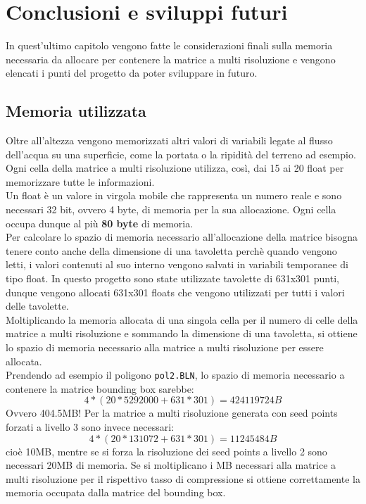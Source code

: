 \chapter{Conclusioni e sviluppi futuri}
	In quest'ultimo capitolo vengono fatte le considerazioni finali sulla memoria necessaria da allocare per contenere la matrice a multi risoluzione e vengono elencati i punti del progetto da poter sviluppare in futuro.

	\section{Memoria utilizzata}
		Oltre all'altezza vengono memorizzati altri valori di variabili legate al flusso dell'acqua su una superficie, come la portata o la ripidit\`{a} del terreno ad esempio. Ogni cella della matrice a multi risoluzione utilizza, cos\`{i}, dai 15 ai 20 float per memorizzare tutte le informazioni.\\
		Un float \`{e} un valore in virgola mobile che rappresenta un numero reale e sono necessari 32 bit, ovvero 4 byte, di memoria per la sua allocazione. Ogni cella occupa dunque al pi\`{u} \textbf{80 byte} di memoria.\\
		Per calcolare lo spazio di memoria necessario all'allocazione della matrice bisogna tenere conto anche della dimensione di una tavoletta perch\`{e} quando vengono letti, i valori contenuti al suo interno vengono salvati in variabili temporanee di tipo float. In questo progetto sono state utilizzate tavolette di 631x301 punti, dunque vengono allocati 631x301 floats che vengono utilizzati per tutti i valori delle tavolette.\\
		Moltiplicando la memoria allocata di una singola cella per il numero di celle della matrice a multi risoluzione e sommando la dimensione di una tavoletta, si ottiene lo spazio di memoria necessario alla matrice a multi risoluzione per essere allocata.\\
		Prendendo ad esempio il poligono \texttt{pol2.BLN}, lo spazio di memoria necessario a contenere la matrice bounding box sarebbe:
		\[
			4*(20*5292000+631*301) = 424119724 B
		\]
		Ovvero 404.5MB! Per la matrice a multi risoluzione generata con seed points forzati a livello 3 sono invece necessari:
		\[
			4*(20*131072+631*301) = 11245484 B
		\]
		cio\`{e} 10MB, mentre se si forza la risoluzione dei seed points a livello 2 sono necessari 20MB di memoria. Se si moltiplicano i MB necessari alla matrice a multi risoluzione per il rispettivo tasso di compressione si ottiene correttamente la memoria occupata dalla matrice del bounding box.

